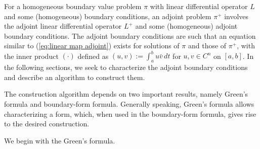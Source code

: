 \documentclass[11pt, oneside, a4paper]{article}
\begin{document}
For a homogeneous boundary value problem $\pi$ with linear differential operator $L$ and some (homogeneous) boundary conditions, an adjoint problem $\pi^+$ involves the adjoint linear differential operator $L^+$ and some (homogeneous) adjoint boundary conditions. The adjoint boundary conditions are such that an equation similar to (\ref{eq:linear map adjoint}) exists for solutions of $\pi$ and those of $\pi^+$, with the inner product $(\cdot)$ defined as $(u,v) := \int_a^b u\bar{v}\,dt$ for $u, v\in C^n$ on $[a,b]$. In the following sections, we seek to characterize the adjoint boundary conditions and describe an algorithm to construct them.

The construction algorithm depends on two important results, namely Green's formula and boundary-form formula. Generally speaking, Green's formula allows characterizing a form, which, when used in the boundary-form formula, gives rise to the desired construction. 

We begin with the Green's formula.
\end{document}
